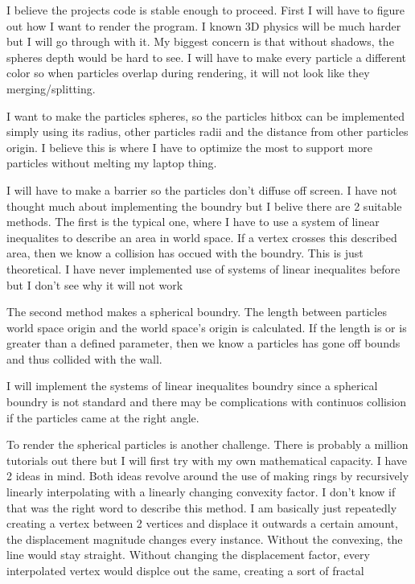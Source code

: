 \documentclass{article}
\begin{document}
I believe the projects code is stable enough to proceed. First I will have to figure out how I want to 
render the program. I known 3D physics will be much harder but I will go through with it. My biggest
concern is that without shadows, the spheres depth would be hard to see. I will have to make every particle
a different color so when particles overlap during rendering, it will not look like they merging/splitting.

I want to make the particles spheres, so the particles hitbox can be implemented simply using its radius, other 
particles radii and the distance from other particles origin. I believe this is where I have to optimize the 
most to support more particles without melting my laptop thing. 

I will have to make a barrier so the particles don't diffuse off screen. I have not thought much about 
implementing the boundry but I belive there are 2 suitable methods. The first is the typical one, where I 
have to use a system of linear inequalites to describe an area in world space. If a vertex crosses this 
described area, then we know a collision has occued with the boundry. This is just theoretical. I have 
never implemented use of systems of linear inequalites before but I don't see why it will not work

The second method makes a spherical boundry. The length between particles world space origin and the
world space's origin is calculated. If the length is or is greater than a defined parameter, then we
know a particles has gone off bounds and thus collided with the wall.

I will implement the systems of linear inequalites boundry since a spherical boundry is not standard 
and there may be complications with continuos collision if the particles came at the right angle.

To render the spherical particles is another challenge. There is probably a million tutorials out there
but I will first try with my own mathematical capacity. I have 2 ideas in mind. Both ideas revolve 
around the use of making rings by recursively linearly interpolating with a linearly changing convexity
factor. I don't know if that was the right word to describe this method. I am basically just repeatedly 
creating a vertex between 2 vertices and displace it outwards a certain amount, the displacement magnitude 
changes every instance. Without the convexing, the line would stay straight. Without changing the displacement
factor, every interpolated vertex would displce out the same, creating a sort of fractal
\end{document}
